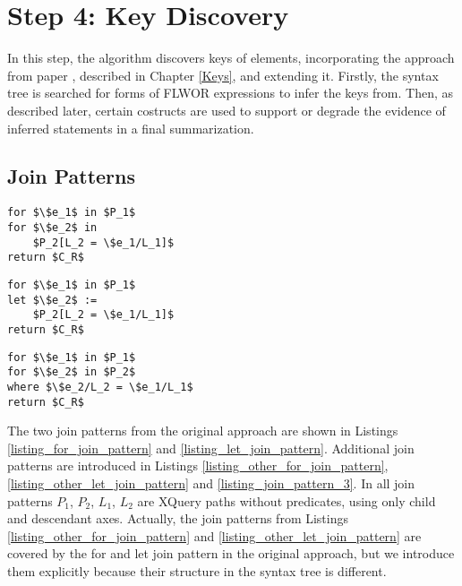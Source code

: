 
\section{Step 4: Key Discovery}
In this step, the algorithm discovers keys of elements, incorporating the approach from paper \cite{Necasky:2009:DXK:1529282.1529414}, described in Chapter \ref{Keys}, and extending it. Firstly, the syntax tree is searched for forms of FLWOR expressions to infer the keys from. Then, as described later, certain costructs are used to support or degrade the evidence of inferred statements in a final summarization.

\subsection{Join Patterns}

\begin{lstlisting}[mathescape, float, caption=Other form of the for join pattern., frame=single, label=listing_other_for_join_pattern]
for $\$e_1$ in $P_1$
for $\$e_2$ in
    $P_2[L_2 = \$e_1/L_1]$
return $C_R$
\end{lstlisting}

\begin{lstlisting}[mathescape, float, caption=Other form of the let join pattern., frame=single, label=listing_other_let_join_pattern]
for $\$e_1$ in $P_1$
let $\$e_2$ :=
    $P_2[L_2 = \$e_1/L_1]$
return $C_R$
\end{lstlisting}

\begin{lstlisting}[mathescape, float, caption=Join pattern 3., frame=single, label=listing_join_pattern_3]
for $\$e_1$ in $P_1$
for $\$e_2$ in $P_2$
where $\$e_2/L_2 = \$e_1/L_1$
return $C_R$
\end{lstlisting}

The two join patterns from the original approach are shown in Listings \ref{listing_for_join_pattern} and \ref{listing_let_join_pattern}. Additional join patterns are introduced in Listings \ref{listing_other_for_join_pattern}, \ref{listing_other_let_join_pattern} and \ref{listing_join_pattern_3}. In all join patterns $P_1$, $P_2$, $L_1$, $L_2$ are XQuery paths without predicates, using only child and descendant axes. Actually, the join patterns from Listings \ref{listing_other_for_join_pattern} and \ref{listing_other_let_join_pattern} are covered by the for and let join pattern in the original approach, but we introduce them explicitly because their structure in the syntax tree is different.

